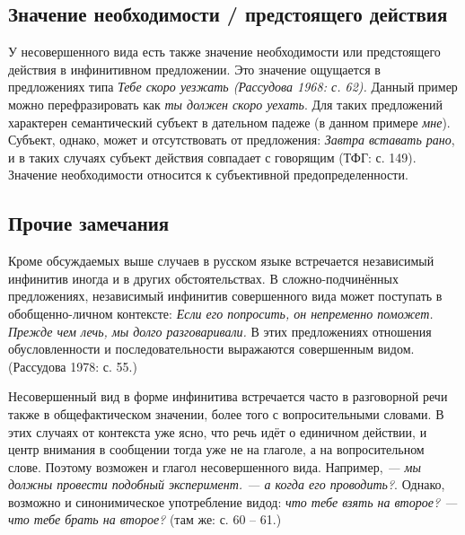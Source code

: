 \subsection{Значение необходимости / предстоящего действия}

У несовершенного вида есть также значение необходимости или предстоящего действия в инфинитивном предложении. Это значение ощущается в предложениях типа \textit{Тебе скоро уезжать (Рассудова 1968: с. 62).} Данный пример можно перефразировать как \textit{ты должен скоро уехать}. Для таких предложений характерен семантический субъект в дательном падеже (в данном примере \textit{мне}). Субъект, однако, может и отсутствовать от предложения: \textit{Завтра вставать рано}, и в таких случаях субъект действия совпадает с говорящим (ТФГ: с. 149). Значение необходимости относится к субъективной предопределенности.

\subsection{Прочие замечания}

Кроме обсуждаемых выше случаев в русском языке встречается независимый инфинитив иногда и в других обстоятельствах. В сложно-подчинённых предложениях, независимый инфинитив совершенного вида может поступать в обобщенно-личном контексте: \textit{Если его попросить, он непременно поможет. Прежде чем лечь, мы долго разговаривали.} В этих предложениях отношения обусловленности и последовательности выражаются совершенным видом. (Рассудова 1978: с. 55.)   

Несовершенный вид в форме инфинитива встречается часто в разговорной речи также в общефактическом значении, более того с вопросительными словами. В этих случаях от контекста уже ясно, что речь идёт о единичном действии, и центр внимания в сообщении тогда уже не на глаголе, а на вопросительном слове. Поэтому возможен и глагол несовершенного вида. Например, \textit{--- мы должны провести подобный эксперимент. --- а когда его проводить?}. Однако, возможно и синонимическое употребление видод: \textit{что тебе взять на второе? --- что тебе брать на второе?} (там же: с. 60 -- 61.)
